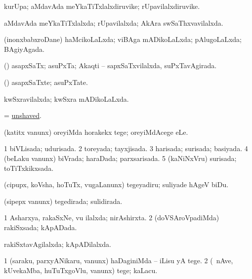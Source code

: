 \bentry
{} 
\gl{\nA}
\expl{}
\bmng
kurUpa; aMdavAda meYkaTiTxlalxdiruvike; rUpavilalxdiruvike. 
\emng
\eentry

\bentry
{} 
\gl{\gu}
\expl{}
\bmng
aMdavAda meYkaTiTxlalxda; rUpavilalxda; AkAra swSaThxvavilalxda. 
\emng
\eentry

\bentry
{} 
\gl{\gu}
\expl{}
\bmng
(inonxbabxroDane) haMcikoLaLxda; viBAga mADikoLaLxda; pAlugoLaLxda; BAgiyAgada. 
\emng
\eentry

\bentry
{} 
\gl{\gu}
\expl{}
\bmng
(\CA) asapxSaTx; asuPxTa; Akaqti -- sapxSaTxvilalxda, suPxTavAgirada. 
\emng
\eentry

\bentry
{} 
\gl{\nA}
\expl{}
\bmng
(\CA) asapxSaTxte; asuPxTate. 
\emng
\eentry

\bentry
{} 
\gl{\gu}
\expl{}
\bmng
kwSxravilalxda; kwSxra mADikoLaLxda. 
\emng
\eentry

\bentry
{} 
\gl{\gu}
\expl{}
\bmng
= \hyperlink{unshaved}{unshaved}. 
\emng
\eentry

\bentry
{} 
\gl{\sakirx}
\expl{}
\bmng
(katitx \mo vanunx) oreyiMda horakekx tege; oreyiMdAcege eLe. 
\emng
\eentry

\bentry
{} 
\gl{\gu}
\expl{}
\bmng
\bnum
\num{1} biVLisada; udurisada. 
\num{2} toreyada; tayxjisada. 
\num{3} harisada; surisada; basiyada. 
\num{4} (beLaku \mo vanunx) biVrada; haraDada; parxsarisada. 
\num{5} (kaNiNxVru) surisada; toTiTxkikxsada. 
\enum
\emng
\eentry

\bentry
{} 
\gl{\sakirx}
\expl{}
\bmng
(cipupx, koVsha, hoTuTx, \mo vugaLanunx) tegeyadiru; suliyade hAgeV biDu. 
\emng
\eentry

\bentry
{} 
\gl{\gu}
\expl{}
\bmng
(sipepx \mo vanunx) tegedirada; sulidirada. 
\emng
\eentry

\bentry
{} 
\gl{\gu}
\expl{}
\bmng
\bnum
\num{1} Asharxya, rakaSxNe, \mo vu ilalxda; nirAshirxta. 
\num{2} (doVSAroVpadiMda) rakiSxsada; kApADada. 
\enum
\emng
\eentry

\bentry
{} 
\gl{\gu}
\expl{}
\bmng
rakiSxtavAgilalxda; kApADilalxda. 
\emng
\eentry

\bentry
{} 
\gl{\akirx}
\bmng
\bnum
\num{1} (saraku, parxyANikaru, \mo vanunx) haDaginiMda -- iLisu yA tege. 
\num{2} (\kanmu\ nAve, kUvekaMba, huTuTxgoVlu, \mo vanunx) tege; kaLacu. 
\enum
\emng
\eentry


